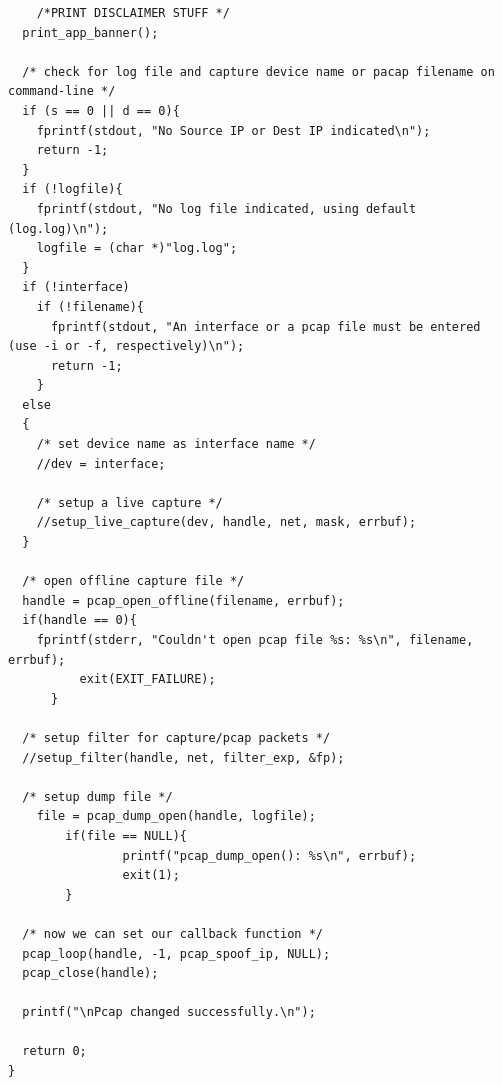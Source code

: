 \documentclass[12pt,english,oneside]{book}
\begin{document}
\begin{lstlisting}
    /*PRINT DISCLAIMER STUFF */
  print_app_banner();

  /* check for log file and capture device name or pacap filename on command-line */
  if (s == 0 || d == 0){
    fprintf(stdout, "No Source IP or Dest IP indicated\n");
    return -1;
  }
  if (!logfile){
    fprintf(stdout, "No log file indicated, using default (log.log)\n");
    logfile = (char *)"log.log";
  }
  if (!interface)
    if (!filename){
      fprintf(stdout, "An interface or a pcap file must be entered (use -i or -f, respectively)\n");
      return -1;
    }
  else
  {
    /* set device name as interface name */
    //dev = interface;
    
    /* setup a live capture */
    //setup_live_capture(dev, handle, net, mask, errbuf);
  }
  
  /* open offline capture file */
  handle = pcap_open_offline(filename, errbuf);
  if(handle == 0){
    fprintf(stderr, "Couldn't open pcap file %s: %s\n", filename, errbuf);
          exit(EXIT_FAILURE);
      }

  /* setup filter for capture/pcap packets */
  //setup_filter(handle, net, filter_exp, &fp);
  
  /* setup dump file */
    file = pcap_dump_open(handle, logfile);
        if(file == NULL){
                printf("pcap_dump_open(): %s\n", errbuf);
                exit(1);
        }
  
  /* now we can set our callback function */
  pcap_loop(handle, -1, pcap_spoof_ip, NULL);
  pcap_close(handle);

  printf("\nPcap changed successfully.\n");

  return 0;
}
\end{lstlisting}

\cleardoublepage


\cleardoublepage



\nocite{*}
\end{document}
